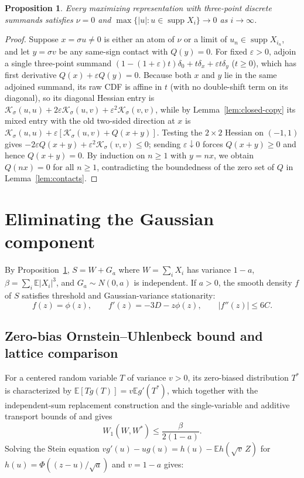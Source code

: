 \documentclass[11pt]{article}
\numberwithin{equation}{section}
\newtheorem{proposition}[theorem]{Proposition}
\theoremstyle{definition}
\DeclareMathOperator{\supp}{supp}
\newcommand{\E}{\mathbb E}
\newcommand{\eps}{\varepsilon}
\begin{document}
\begin{proposition}\label{prop:shrink}
Every maximizing representation with three-point discrete summands satisfies
$\nu=0$ and $\max\{|u|:u\in\supp X_i\}\to0$ as $i\to\infty$.
\end{proposition}
\begin{proof}
Suppose $x=\sigma u\ne0$ is either an atom of $\nu$ or a limit of
$u_n\in\supp X_{i_n}$, and let $y=\sigma v$ be any same-sign contact with
$Q(y)=0$. For fixed $\eps>0$, adjoin a single three-point summand
$(1-(1+\eps)t)\delta_0+t\delta_x+\eps t\delta_y$ ($t\ge0$), which has first
derivative $Q(x)+\eps Q(y)=0$. Because both $x$ and $y$ lie in the same
adjoined summand, its raw CDF is affine in $t$ (with no double-shift term on
its diagonal), so its diagonal Hessian entry is
$\mathcal K_\sigma(u,u)+2\eps\mathcal K_\sigma(u,v)+\eps^2\mathcal K_\sigma(v,v)$,
while by Lemma~\ref{lem:closed-copy} its mixed entry with the old two-sided
direction at $x$ is $\mathcal K_\sigma(u,u)+\eps[\mathcal K_\sigma(u,v)+Q(x+y)]$.
Testing the $2\times2$ Hessian on $(-1,1)$ gives
$-2\eps Q(x+y)+\eps^2\mathcal K_\sigma(v,v)\le0$; sending $\eps\downarrow0$
forces $Q(x+y)\ge0$ and hence $Q(x+y)=0$. By induction on $n\ge1$ with
$y=nx$, we obtain $Q(nx)=0$ for all $n\ge1$, contradicting the boundedness of
the zero set of $Q$ in Lemma~\ref{lem:contacts}.
\end{proof}

\section{Eliminating the Gaussian component}\label{sec:gaussian}

By Proposition~\ref{prop:shrink}, $S=W+G_a$ where $W=\sum_i X_i$ has variance
$1-a$, $\beta=\sum_i\E|X_i|^3$, and $G_a\sim N(0,a)$ is independent. If
$a>0$, the smooth density $f$ of $S$ satisfies threshold and Gaussian-variance
stationarity:
\begin{equation}\label{eq:gauss-stationarity}
 f(z)=\phi(z),\qquad f'(z)=-3D-z\phi(z),\qquad |f''(z)|\le6C.
\end{equation}

\subsection{Zero-bias Ornstein--Uhlenbeck bound and lattice comparison}

For a centered random variable $T$ of variance $v>0$, its zero-biased
distribution $T^*$ is characterized by $\E[Tg(T)]=v\E g'(T^*)$, which together
with the independent-sum replacement construction \citep{GoldsteinReinert1997}
and the single-variable and additive transport bounds of
\citet[Lemma~1.1]{Goldstein2010} and \citet[Theorem~3 and Corollary~1]{Tyurin2009}
gives
\begin{equation}\label{eq:zero-bias}
                  W_1(W,W^*)\le\frac{\beta}{2(1-a)}.
\end{equation}
Solving the Stein equation $vg'(u)-ug(u)=h(u)-\E h(\sqrt v\,Z)$ for
$h(u)=\Phi((z-u)/\sqrt a)$ and $v=1-a$ gives:
\end{document}
